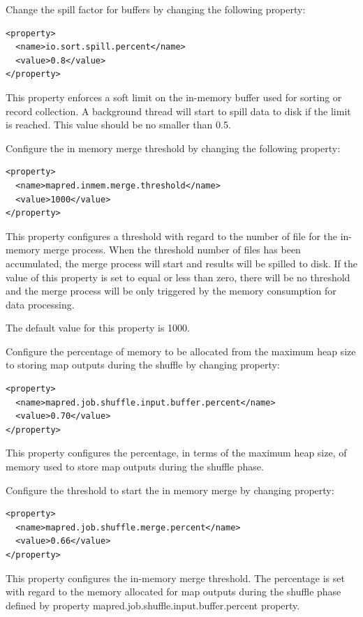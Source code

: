 Change the spill factor for buffers by changing the following property:
\lstset{style=bashstyle}
\begin{lstlisting}
<property>
  <name>io.sort.spill.percent</name>
  <value>0.8</value>
</property>
\end{lstlisting}
This property enforces a soft limit on the in-memory buffer used for sorting or record collection. A background thread will start to spill data to disk if the limit is reached. This value should be no smaller than 0.5.

Configure the in memory merge threshold by changing the following property:
\lstset{style=bashstyle}
\begin{lstlisting}
<property>
  <name>mapred.inmem.merge.threshold</name>
  <value>1000</value>
</property>
\end{lstlisting}
This property configures a threshold with regard to the number of file for the in-memory merge process. When the threshold number of files has been accumulated, the merge process will start and results will be spilled to disk. If the value of this property is set to equal or less than zero, there will be no threshold and the merge process will be only triggered by the memory consumption for data processing.

\begin{info}The default value for this property is 1000.\end{info}

Configure the percentage of memory to be allocated from the maximum heap size to storing map outputs during the shuffle by changing property:
\lstset{style=bashstyle}
\begin{lstlisting}
<property>
  <name>mapred.job.shuffle.input.buffer.percent</name>
  <value>0.70</value>
</property>
\end{lstlisting}

This property configures the percentage, in terms of the maximum heap size, of memory used to store map outputs during the shuffle phase.

Configure the threshold to start the in memory merge by changing property:
\lstset{style=bashstyle}
\begin{lstlisting}
<property>
  <name>mapred.job.shuffle.merge.percent</name>
  <value>0.66</value>
</property>
\end{lstlisting}

This property configures the in-memory merge threshold. The percentage is set with regard to the memory allocated for map outputs during the shuffle phase defined by property mapred.job.shuffle.input.buffer.percent property.

